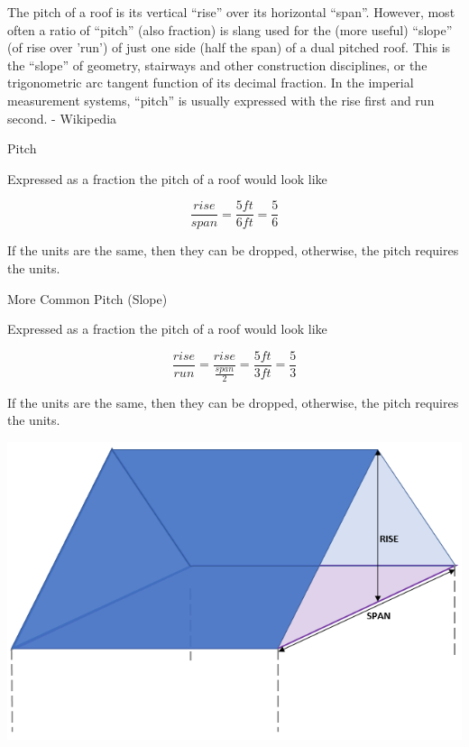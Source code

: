 \documentclass{ximera}
\author{Alan Yang}
\begin{document}
The pitch of a roof is its vertical ``rise'' over its horizontal ``span''. However, most often a ratio of ``pitch'' (also fraction) is slang used for the (more useful) ``slope'' (of rise over 'run') of just one side (half the span) of a dual pitched roof. This is the ``slope'' of geometry, stairways and other construction disciplines, or the trigonometric arc tangent function of its decimal fraction. In the imperial measurement systems, ``pitch'' is usually expressed with the rise first and run second. - Wikipedia


\begin{example} Pitch


Expressed as a fraction the pitch of a roof would look like

\[
\frac{rise}{span} = \frac{5 ft}{6 ft} = \frac{5}{6}
\]

If the units are the same, then they can be dropped, otherwise, the pitch requires the units.
\end{example}






\begin{example} More Common Pitch (Slope)


Expressed as a fraction the pitch of a roof would look like

\[
\frac{rise}{run} = \frac{rise}{\tfrac{span}{2}} = \frac{5 ft}{3 ft} = \frac{5}{3}
\]

If the units are the same, then they can be dropped, otherwise, the pitch requires the units.
\end{example}






\begin{image}
\includegraphics{pics/roofPitch.png}
\end{image}
\end{document}
